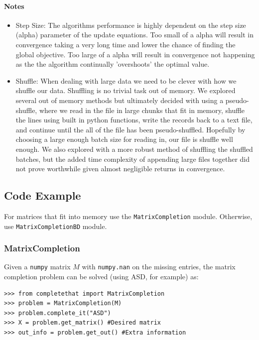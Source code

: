 \documentclass[12pt]{article}
\begin{document}
\paragraph{Notes}
\begin{itemize}

	\item Step Size: The algorithms performance is highly dependent on the step size (alpha) parameter of the update equations. Too small of a alpha will result in convergence taking a very long time and lower the chance of finding the global objective. Too large of a alpha will result in convergence not happening as the the algorithm continually 'overshoots' the optimal value. 
	
	\item Shuffle: When dealing with large data we need to be clever with how we shuffle our data. Shuffling is no trivial task out of memory. We explored several out of memory methods but ultimately decided with using a pseudo-shuffle, where we read in the file in large chunks that fit in memory, shuffle the lines using built in python functions, write the records back to a text file, and continue until the all of the file has been pseudo-shuffled. Hopefully by choosing a large enough batch size for reading in, our file is shuffle well enough. We also explored with a more robust method of shuffling the shuffled batches, but the added time complexity of appending large files together did not prove worthwhile given almost negligible returns in convergence.

\end{itemize}

\subsection*{Code Example}
For matrices that fit into memory use the \texttt{MatrixCompletion} module. Otherwise, use \texttt{MatrixCompletionBD} module. 

\subsubsection*{MatrixCompletion}
Given a \texttt{numpy} matrix $M$ with \texttt{numpy.nan} on the missing entries, the matrix completion problem can be solved (using ASD, for example) as:
\begin{verbatim}
>>> from completethat import MatrixCompletion
>>> problem = MatrixCompletion(M)
>>> problem.complete_it("ASD")
>>> X = problem.get_matrix() #Desired matrix
>>> out_info = problem.get_out() #Extra information
\end{verbatim}
\end{document}

